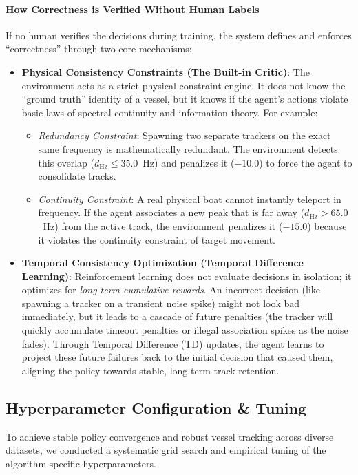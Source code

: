 \documentclass[12pt,a4paper]{article}
\begin{document}
\paragraph{How Correctness is Verified Without Human Labels}
If no human verifies the decisions during training, the system defines and enforces ``correctness'' through two core mechanisms:
\begin{itemize}
    \item \textbf{Physical Consistency Constraints (The Built-in Critic)}: The environment acts as a strict physical constraint engine. It does not know the ``ground truth'' identity of a vessel, but it knows if the agent's actions violate basic laws of spectral continuity and information theory. For example:
    \begin{itemize}
        \item \textit{Redundancy Constraint}: Spawning two separate trackers on the exact same frequency is mathematically redundant. The environment detects this overlap ($d_{\text{Hz}} \le 35.0$~Hz) and penalizes it ($-10.0$) to force the agent to consolidate tracks.
        \item \textit{Continuity Constraint}: A real physical boat cannot instantly teleport in frequency. If the agent associates a new peak that is far away ($d_{\text{Hz}} > 65.0$~Hz) from the active track, the environment penalizes it ($-15.0$) because it violates the continuity constraint of target movement.
    \end{itemize}
    \item \textbf{Temporal Consistency Optimization (Temporal Difference Learning)}: Reinforcement learning does not evaluate decisions in isolation; it optimizes for \textit{long-term cumulative rewards}. An incorrect decision (like spawning a tracker on a transient noise spike) might not look bad immediately, but it leads to a cascade of future penalties (the tracker will quickly accumulate timeout penalties or illegal association spikes as the noise fades). Through Temporal Difference (TD) updates, the agent learns to project these future failures back to the initial decision that caused them, aligning the policy towards stable, long-term track retention.
\end{itemize}

\subsection{Hyperparameter Configuration \& Tuning}
To achieve stable policy convergence and robust vessel tracking across diverse datasets, we conducted a systematic grid search and empirical tuning of the algorithm-specific hyperparameters. 
\end{document}
